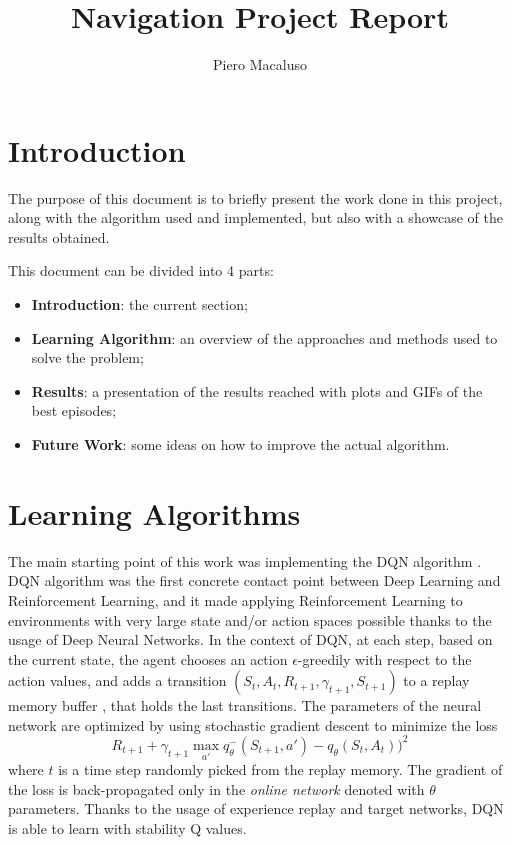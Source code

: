 \documentclass[letterpaper]{article}
\begin{document}
%
\title{Navigation Project Report}
\author{Piero Macaluso}
\maketitle

\section{Introduction}

The purpose of this document is to briefly present the work done in this project, along with the algorithm used and implemented, but also with a showcase of the results obtained.

This document can be divided into 4 parts:

\begin{itemize}
\item \textbf{Introduction}: the current section;
\item \textbf{Learning Algorithm}: an overview of the approaches and methods used to solve the problem;
\item \textbf{Results}: a presentation of the results reached with plots and GIFs of the best episodes;
\item \textbf{Future Work}: some ideas on how to improve the actual algorithm.
\end{itemize}

\section{Learning Algorithms}

The main starting point of this work was implementing the DQN algorithm \cite{mnih2015human}.
DQN algorithm was the first concrete contact point between Deep Learning and Reinforcement Learning, and it made applying Reinforcement Learning to environments with very large state and/or action spaces possible thanks to the usage of Deep Neural Networks.
In the context of DQN, at each step, based on the current state, the agent chooses an action $\epsilon$-greedily with respect to the action values, and adds a transition $(S_t, A_t, R_{t+1}, \gamma_{t+1}, S_{t+1})$ to a replay memory buffer \cite{lin1992self}, that holds the last transitions. The parameters of the neural network are optimized by using stochastic gradient descent to minimize the loss
\begin{equation}
    R_{t+1} + \gamma_{t+1} \max_{a'}q_\theta^-(S_{t+1}, a') -q_\theta(S_t,A_t))^2
    \label{eq:loss}
\end{equation}
where $t$ is a time step randomly picked from the replay memory. The gradient of the loss is back-propagated only in the \textit{online network} denoted with $\theta$ parameters. Thanks to the usage of experience replay and target networks, DQN is able to learn with stability Q values.
\end{document}
